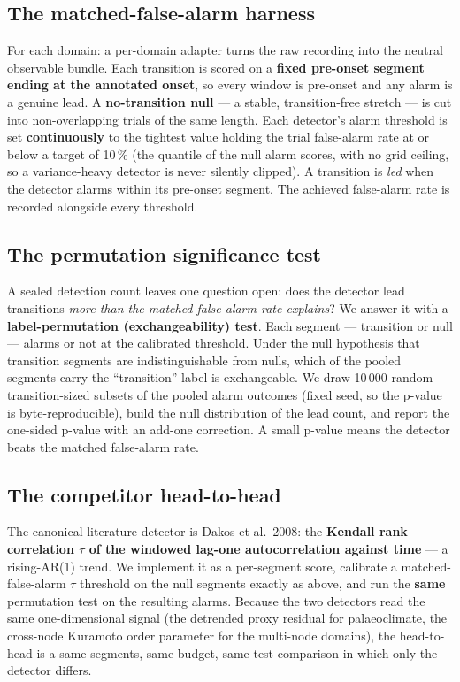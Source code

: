 \documentclass[11pt]{article}
\begin{document}
\subsection{The matched-false-alarm harness}

For each domain: a per-domain adapter turns the raw recording into the
neutral observable bundle. Each transition is scored on a \textbf{fixed
pre-onset segment ending at the annotated onset}, so every window is
pre-onset and any alarm is a genuine lead. A \textbf{no-transition null}
--- a stable, transition-free stretch --- is cut into non-overlapping
trials of the same length. Each detector's alarm threshold is set
\textbf{continuously} to the tightest value holding the trial
false-alarm rate at or below a target of 10\,\% (the quantile of the
null alarm scores, with no grid ceiling, so a variance-heavy detector is
never silently clipped). A transition is \emph{led} when the detector
alarms within its pre-onset segment. The achieved false-alarm rate is
recorded alongside every threshold.

\subsection{The permutation significance test}

A sealed detection count leaves one question open: does the detector
lead transitions \emph{more than the matched false-alarm rate explains}?
We answer it with a \textbf{label-permutation (exchangeability) test}.
Each segment --- transition or null --- alarms or not at the calibrated
threshold. Under the null hypothesis that transition segments are
indistinguishable from nulls, which of the pooled segments carry the
``transition'' label is exchangeable. We draw 10\,000 random
transition-sized subsets of the pooled alarm outcomes (fixed seed, so
the p-value is byte-reproducible), build the null distribution of the
lead count, and report the one-sided p-value with an add-one correction.
A small p-value means the detector beats the matched false-alarm rate.

\subsection{The competitor head-to-head}

The canonical literature detector is Dakos et al.\ 2008: the
\textbf{Kendall rank correlation $\tau$ of the windowed lag-one
autocorrelation against time} --- a rising-AR(1) trend. We implement it
as a per-segment score, calibrate a matched-false-alarm $\tau$ threshold
on the null segments exactly as above, and run the \textbf{same}
permutation test on the resulting alarms. Because the two detectors read
the same one-dimensional signal (the detrended proxy residual for
palaeoclimate, the cross-node Kuramoto order parameter for the
multi-node domains), the head-to-head is a same-segments, same-budget,
same-test comparison in which only the detector differs.
\end{document}
